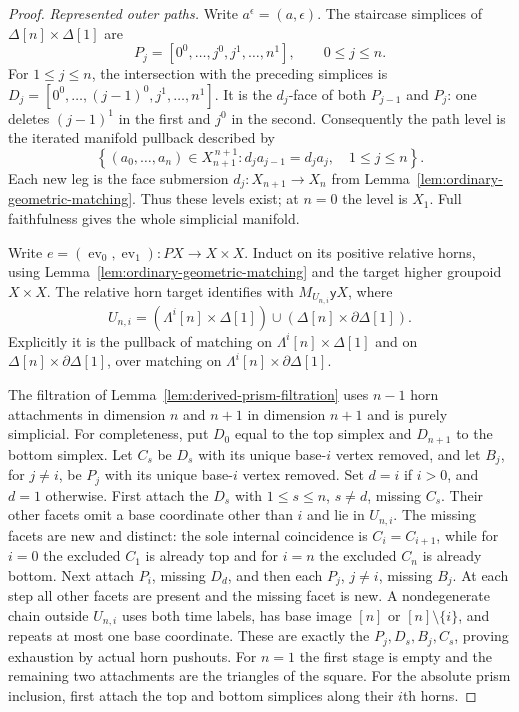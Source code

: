 \documentclass[12pt]{amsart}
\theoremstyle{definition}
\theoremstyle{remark}
\numberwithin{equation}{section}
\newcommand{\y}{\mathsf y}
\begin{document}
\begin{proof}
\emph{Represented outer paths.}
Write $a^\epsilon=(a,\epsilon)$. The staircase simplices
of $\Delta[n]\times\Delta[1]$ are
\[
 P_j=[0^0,\ldots,j^0,j^1,\ldots,n^1],
 \qquad 0\le j\le n.
\]
For $1\le j\le n$, the intersection with the preceding
simplices is
$D_j=[0^0,\ldots,(j-1)^0,j^1,\ldots,n^1]$.
It is the $d_j$-face of both $P_{j-1}$ and $P_j$:
one deletes $(j-1)^1$ in the first and $j^0$ in the second.
Consequently the path level is the iterated manifold
pullback described by
\[
 \left\{(a_0,\ldots,a_n)\in X_{n+1}^{\,n+1}:
 d_ja_{j-1}=d_ja_j,\quad 1\le j\le n\right\}.
\]
Each new leg is the face submersion
$d_j:X_{n+1}\to X_n$ from
Lemma~\ref{lem:ordinary-geometric-matching}. Thus these
levels exist; at $n=0$ the level is $X_1$.
Full faithfulness gives the whole simplicial manifold.

Write $e=(\operatorname{ev}_0,\operatorname{ev}_1):
PX\to X\times X$. Induct on its positive relative
horns, using Lemma~\ref{lem:ordinary-geometric-matching}
and the target higher groupoid $X\times X$.
The relative horn target identifies with $M_{U_{n,i}}\y X$,
where
\[
 U_{n,i}=(\Lambda^i[n]\times\Delta[1])
          \cup(\Delta[n]\times\partial\Delta[1]).
\]
Explicitly it is the pullback of matching on
$\Lambda^i[n]\times\Delta[1]$ and on
$\Delta[n]\times\partial\Delta[1]$, over matching on
$\Lambda^i[n]\times\partial\Delta[1]$.

The filtration of
Lemma~\ref{lem:derived-prism-filtration} uses
$n-1$ horn attachments in dimension $n$ and
$n+1$ in dimension $n+1$ and is purely simplicial.
For completeness, put $D_0$ equal to the top simplex
and $D_{n+1}$ to the bottom simplex. Let $C_s$ be
$D_s$ with its unique base-$i$ vertex removed, and
let $B_j$, for $j\ne i$, be $P_j$ with its unique
base-$i$ vertex removed. Set $d=i$ if $i>0$, and
$d=1$ otherwise. First attach the $D_s$ with
$1\le s\le n$, $s\ne d$, missing $C_s$.
Their other facets omit a base coordinate other than
$i$ and lie in $U_{n,i}$. The missing facets are new
and distinct: the sole internal coincidence is
$C_i=C_{i+1}$, while for $i=0$ the excluded $C_1$
is already top and for $i=n$ the excluded $C_n$
is already bottom.
Next attach $P_i$, missing $D_d$, and then each
$P_j$, $j\ne i$, missing $B_j$.
At each step all other facets are present and the
missing facet is new. A nondegenerate chain outside
$U_{n,i}$ uses both time labels, has base image
$[n]$ or $[n]\setminus\{i\}$, and repeats at most
one base coordinate. These are exactly the
$P_j,D_s,B_j,C_s$, proving exhaustion by actual
horn pushouts. For $n=1$ the first stage is empty
and the remaining two attachments are the triangles
of the square. For the absolute prism inclusion,
first attach the top and bottom simplices along
their $i$th horns.


\end{proof}
\end{document}
